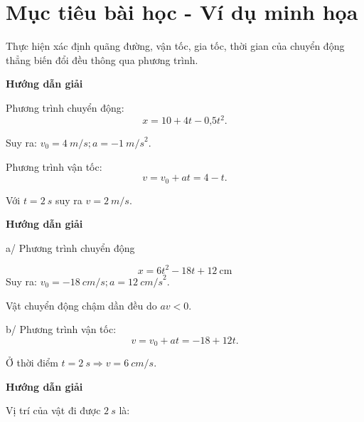 \section{Mục tiêu bài học - Ví dụ minh họa}
\begin{dang}{Thực hiện xác định quãng đường, vận tốc, gia tốc, thời gian của chuyển động thẳng biến đổi đều thông qua phương trình.}
	{	\begin{center}
			\textbf{Hướng dẫn giải}
		\end{center}
		
		Phương trình chuyển động:
		$$x = 10 + 4t - \text{0,5}t^2.$$
		
		Suy ra: $v_0 = \SI{4}{m/s}; a =-\SI{1}{m/s}^2$.
		
		Phương trình vận tốc:
		$$v =v_0 +at =4-t.$$
		
		Với $t =\SI{2}{s}$ suy ra $v= \SI{2}{m/s}$.
		
	}
	{	\begin{center}
			\textbf{Hướng dẫn giải}
		\end{center}
		
		a/ Phương trình chuyển động
		
		$$x = 6t^2 - 18t + 12 \ \text{cm}$$
		Suy ra: $v_0 = -\SI{18}{cm/s}; a =\SI{12}{cm/s}^2$.
		
		Vật chuyển động chậm dần đều do $av<0$.
		
		b/ Phương trình vận tốc:
		$$v =v_0 +at =-18+12t.$$
		
		Ở thời điểm $t=\SI{2}{s} \Rightarrow v =\SI{6}{cm/s}$.
		
	}
	
	{	\begin{center}
			\textbf{Hướng dẫn giải}
		\end{center}
		
		Vị trí của vật đi được $\SI{2}{s}$ là:
		
}
\end{dang}
